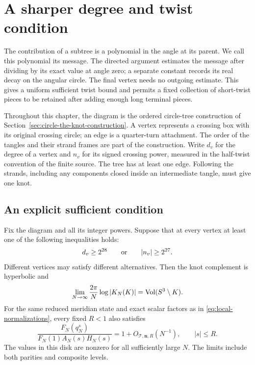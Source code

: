 \chapter{A sharper degree and twist condition}
\label{ch:directed-circle-messages}

The contribution of a subtree is a polynomial in the angle at its
parent. We call this polynomial its message. The directed argument
estimates the message after dividing by its exact value at angle zero;
a separate constant records its real decay on the angular circle. The final vertex needs no outgoing estimate. This gives
a uniform sufficient twist bound and permits a fixed collection of
short-twist pieces to be retained after adding enough long terminal
pieces.

Throughout this chapter, the diagram is the ordered circle-tree
construction of Section~\ref{sec:circle-the-knot-construction}. A vertex
represents a crossing box with its original crossing circle; an edge is
a quarter-turn attachment. The order of the tangles and their
strand frames are part of the construction. Write $d_v$ for the degree
of a vertex and $n_v$ for its signed crossing power, measured in the
half-twist convention of the finite source. The tree has at least one
edge. Following the strands, including any components closed
inside an intermediate tangle, must give one knot.

\section{An explicit sufficient condition}

\begin{theorem}
\label{thm:directed-degree-twist}
Fix the diagram and all its integer powers. Suppose that at every vertex
at least one of the following inequalities holds:
\begin{equation}\label{eq:directed-mixed}
                 d_v\ge 2^{28}
                 \qquad\hbox{or}\qquad |n_v|\ge 2^{27}.
\end{equation}
Different vertices may satisfy different alternatives. Then the knot
complement is hyperbolic and
\begin{equation}\label{eq:directed-volume}
 \lim_{N\to\infty}\frac{2\pi}{N}\log|K_N(K)|
                  =\operatorname{Vol}(S^3\setminus K).
\end{equation}
For the same reduced meridian state and exact scalar factors as in
\eqref{eq:local-normalizations}, every fixed $R<1$ also satisfies
\begin{equation}\label{eq:directed-profile}
 \frac{F_N(q_N^s)}{F_N(1)A_N(s)H_N(s)}
       =1+O_{\mathcal T,\mathbf n,R}(N^{-1}),\qquad |s|\le R.
\end{equation}
The values in this disk are nonzero for all sufficiently large $N$.
The limits include both parities and composite levels.
\end{theorem}

